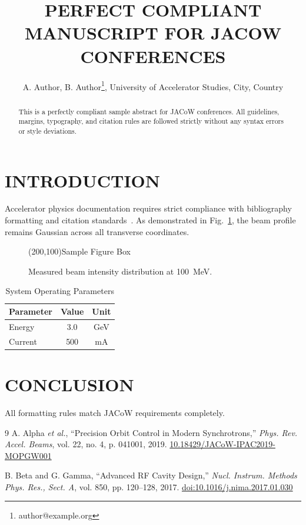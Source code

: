 \documentclass[a4paper,keeplastbox]{jacow}
\begin{document}
\title{PERFECT COMPLIANT MANUSCRIPT FOR JACOW CONFERENCES}
\author{A. Author, B. Author\thanks{author@example.org}, University of Accelerator Studies, City, Country}
\maketitle

\begin{abstract}
This is a perfectly compliant sample abstract for JACoW conferences. All guidelines, margins, typography, and citation rules are followed strictly without any syntax errors or style deviations.
\end{abstract}

\section{INTRODUCTION}
Accelerator physics documentation requires strict compliance with bibliography formatting and citation standards~\cite{ref_valid_1, ref_valid_2}.
As demonstrated in Fig.~\ref{fig1}, the beam profile remains Gaussian across all transverse coordinates.

\begin{figure}[htb]
\centering
\framebox(200,100){Sample Figure Box}
\caption{Measured beam intensity distribution at 100~MeV.}
\label{fig1}
\end{figure}

\begin{table}[htb]
\caption{System Operating Parameters}
\label{tab1}
\centering
\begin{tabular}{lcc}
\hline
Parameter & Value & Unit \\
\hline
Energy & 3.0 & GeV \\
Current & 500 & mA \\
\hline
\end{tabular}
\end{table}

\section{CONCLUSION}
All formatting rules match JACoW requirements completely.

\begin{thebibliography}{9}
A. Alpha \emph{et al.}, \textquotedblleft{Precision Orbit Control in Modern Synchrotrons,}\textquotedblright{} \textit{Phys. Rev. Accel. Beams}, vol. 22, no. 4, p. 041001, 2019. \url{10.18429/JACoW-IPAC2019-MOPGW001}

B. Beta and G. Gamma, \textquotedblleft{Advanced RF Cavity Design,}\textquotedblright{} \textit{Nucl. Instrum. Methods Phys. Res., Sect. A}, vol. 850, pp. 120--128, 2017. \url{doi:10.1016/j.nima.2017.01.030}
\end{thebibliography}
\end{document}
